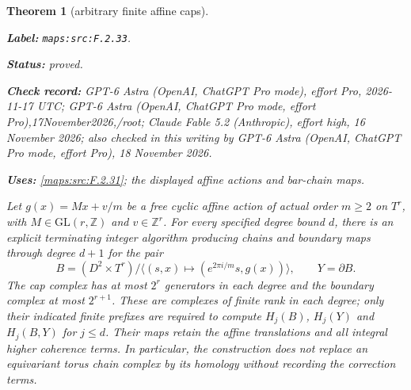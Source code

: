 \documentclass[11pt,a4paper]{article}
\newtheorem{theorem}{Theorem}[section]
\theoremstyle{definition}
\newcommand{\StatementRecord}[4]{\par\smallskip\begingroup\upshape\raggedright\noindent\textbf{Label:} \nolinkurl{#1}.\par\noindent\textbf{Status:} #2.\par\noindent\textbf{Check record:} #3.\par\noindent\textbf{Uses:} #4.\par\endgroup\smallskip}
\newcommand{\CurrentChecker}{GPT-6 Astra (OpenAI, ChatGPT Pro mode, effort Pro), 18 November 2026}
\begin{document}
\begin{theorem}[arbitrary finite affine caps]\label{maps:src:F.2.33}
\StatementRecord{maps:src:F.2.33}{proved}{GPT-6 Astra (OpenAI, ChatGPT Pro mode), effort Pro, 2026-11-17 UTC; GPT-6 Astra (OpenAI, ChatGPT Pro mode, effort Pro),17November2026,/root; Claude Fable 5.2 (Anthropic), effort high, 16 November 2026; also checked in this writing by \CurrentChecker}{\cref{maps:src:F.2.31}; the displayed affine actions and bar-chain maps}


Let $g(x)=Mx+v/m$ be a free cyclic affine action of actual order
$m\geq2$ on $T^r$, with $M\in\mathrm{GL}(r,\mathbb Z)$ and
$v\in\mathbb Z^r$.  For every specified degree bound $d$, there is
an explicit terminating integer algorithm producing chains and
boundary maps through degree $d+1$ for the pair
\[
 B=(D^2\times T^r)/\langle(s,x)\mapsto
 (e^{2\pi i/m}s,g(x))\rangle,
 \qquad Y=\partial B.                                      \tag{F.CA1}\label{maps:eq:F.CA1}
\]
The cap complex has at most $2^r$ generators in each degree and
the boundary complex at most $2^{r+1}$.  These are complexes of
finite rank in each degree; only their indicated finite prefixes
are required to compute $H_j(B)$, $H_j(Y)$ and $H_j(B,Y)$ for
$j\leq d$.  Their maps retain the affine translations and all
integral higher coherence terms.  In particular, the construction
does not replace an equivariant torus chain complex by its
homology without recording the correction terms.

\end{theorem}
\end{document}
